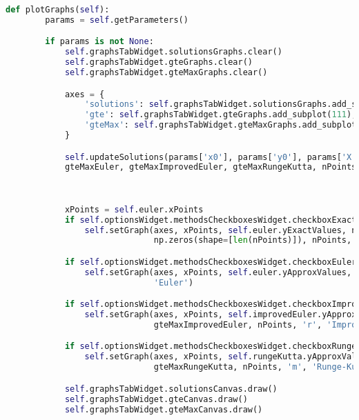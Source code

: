 \documentclass[12pt, a4paper]{article}
\begin{document}
    \newpage
    \begin{lstlisting}[language=Python, caption=ApplicationWindow.plotGraphs() method]
    def plotGraphs(self):
        params = self.getParameters()

        if params is not None:
            self.graphsTabWidget.solutionsGraphs.clear()
            self.graphsTabWidget.gteGraphs.clear()
            self.graphsTabWidget.gteMaxGraphs.clear()

            axes = {
                'solutions': self.graphsTabWidget.solutionsGraphs.add_subplot(111),
                'gte': self.graphsTabWidget.gteGraphs.add_subplot(111),
                'gteMax': self.graphsTabWidget.gteMaxGraphs.add_subplot(111)
            }

            self.updateSolutions(params['x0'], params['y0'], params['X'], params['N'])
            gteMaxEuler, gteMaxImprovedEuler, gteMaxRungeKutta, nPoints = self.calculateGteMax(params['x0'], params['y0'],
                                                                                               params['X'], params['n0'],
                                                                                               params['nMax'])

            xPoints = self.euler.xPoints
            if self.optionsWidget.methodsCheckboxesWidget.checkboxExact.isChecked():
                self.setGraph(axes, xPoints, self.euler.yExactValues, np.zeros(shape=[len(self.euler.xPoints)]),
                              np.zeros(shape=[len(nPoints)]), nPoints, 'c', 'Exact')

            if self.optionsWidget.methodsCheckboxesWidget.checkboxEuler.isChecked():
                self.setGraph(axes, xPoints, self.euler.yApproxValues, self.euler.gte, gteMaxEuler, nPoints, 'b',
                              'Euler')

            if self.optionsWidget.methodsCheckboxesWidget.checkboxImprovedEuler.isChecked():
                self.setGraph(axes, xPoints, self.improvedEuler.yApproxValues, self.improvedEuler.gte,
                              gteMaxImprovedEuler, nPoints, 'r', 'Improved Euler')

            if self.optionsWidget.methodsCheckboxesWidget.checkboxRungeKutta.isChecked():
                self.setGraph(axes, xPoints, self.rungeKutta.yApproxValues, self.rungeKutta.gte,
                              gteMaxRungeKutta, nPoints, 'm', 'Runge-Kutta')

            self.graphsTabWidget.solutionsCanvas.draw()
            self.graphsTabWidget.gteCanvas.draw()
            self.graphsTabWidget.gteMaxCanvas.draw()
    \end{lstlisting}
    
\end{document}
